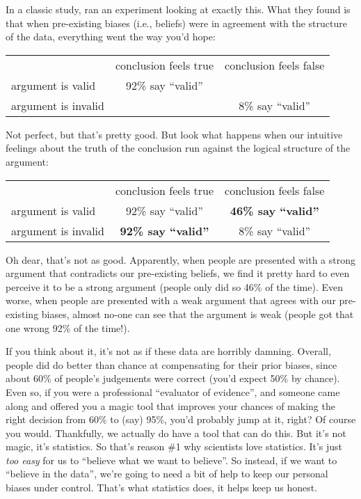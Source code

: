 In a classic study, \textcite{Evans1983} ran an experiment looking at exactly this. What they found is that when pre-existing biases (i.e., beliefs) were in agreement with the structure of the data, everything went the way you'd hope: 
\begin{center}
\renewcommand{\arraystretch}{1.5}
\begin{tabular}{l|cc|}
\multicolumn{1}{c}{} & \multicolumn{1}{c}{conclusion feels true} & \multicolumn{1}{c}{conclusion feels false} \\ \cline{2-3}
argument is valid   & 92\% say ``valid''&  \\ 
argument is invalid &  & 8\% say ``valid''\\ \cline{2-3}
\end{tabular}
\end{center}
Not perfect, but that's pretty good. But look what happens when our intuitive feelings about the truth of the conclusion run against the logical structure of the argument:
\begin{center}
\renewcommand{\arraystretch}{1.5}
\begin{tabular}{l|cc|}
\multicolumn{1}{c}{} & \multicolumn{1}{c}{conclusion feels true} & \multicolumn{1}{c}{conclusion feels false} \\ \cline{2-3}
argument is valid   & 92\% say ``valid'' & {\bf 46\% say ``valid''} \\
argument is invalid & {\bf 92\% say ``valid''} & 8\% say ``valid'' \\ \cline{2-3}
\end{tabular}
\end{center}
Oh dear, that's not as good. Apparently, when people are presented with a strong argument that contradicts our pre-existing beliefs, we find it pretty hard to even perceive it to be a strong argument (people only did so 46\% of the time). Even worse, when people are presented with a weak argument that agrees with our pre-existing biases, almost no-one can see that the argument is weak (people got that one wrong 92\% of the time!).

If you think about it, it's not as if these data are horribly damning. Overall, people did do better than chance at compensating for their prior biases, since about 60\% of people's judgements were correct (you'd expect 50\% by chance). Even so, if you were a professional ``evaluator of evidence'', and someone came along and offered you a magic tool that improves your chances of making the right decision from 60\% to (say) 95\%, you'd probably jump at it, right? Of course you would. Thankfully, we actually do have a tool that can do this. But it's not magic, it's statistics. So that's reason \#1 why scientists love statistics. It's just {\it too easy} for us to ``believe what we want to believe''. So instead, if we want to ``believe in the data'', we're going to need a bit of help to keep our personal biases under control. That's what statistics does,  it helps keep us honest.



